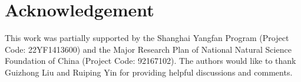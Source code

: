 \documentclass[pdflatex,sn-mathphys]{sn-jnl}%
\theoremstyle{thmstyleone}%
\theoremstyle{thmstyletwo}%
\theoremstyle{thmstylethree}%
\begin{document}
\section*{Acknowledgement}
This work was partially supported by the Shanghai Yangfan Program (Project Code: 22YF1413600) and the Major Research Plan of National Natural Science Foundation of China (Project Code: 92167102). The authors would like to thank Guizhong Liu and Ruiping Yin for providing helpful discussions and comments.











\end{document}
